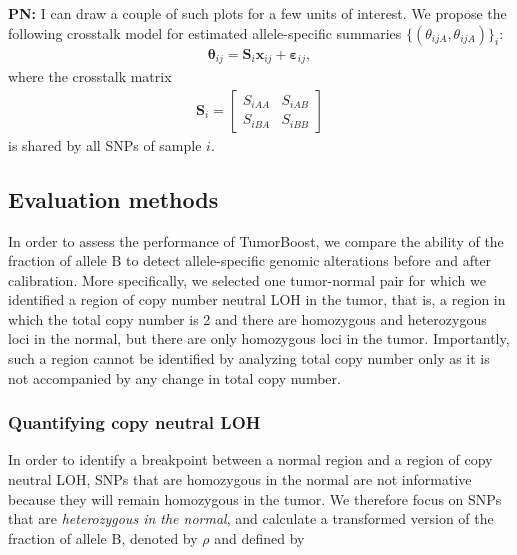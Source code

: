\documentclass[10pt]{bmc_article}
\newenvironment{bmcformat}{\fussy\setboolean{publ}{true}}{\fussy}
\newcommand{\bx}{\mathbf{x}\xspace}
\newcommand{\bS}{\mathbf{S}\xspace}
\newcommand{\beps}{\bm{\varepsilon}\xspace}
\newcommand{\btheta}{\bm{\theta}\xspace}
\newenvironment{PN}{\color{blue}\textbf{PN:}}{}
\begin{document}
\begin{bmcformat}
\begin{PN}
   I can draw a couple of such plots for a few units of interest.
\end{PN}
We propose the following crosstalk model for estimated allele-specific summaries $\{(\theta_{ijA},\theta_{ijA})\}_i$:
\begin{eqnarray*}
  \btheta_{ij} = \bS_i \bx_{ij} + \beps_{ij},
\end{eqnarray*}
where the crosstalk matrix
\begin{eqnarray*}
 \bS_i = 
 \begin{bmatrix}
   S_{iAA} & S_{iAB} \\
   S_{iBA} & S_{iBB}
 \end{bmatrix}
\end{eqnarray*}
is shared by all SNPs of sample $i$.

\subsection*{Evaluation methods}
\label{secEvaluation}

In order to assess the performance of TumorBoost, we compare the ability of the fraction of allele B to detect allele-specific genomic alterations before and after calibration. More specifically, we selected one tumor-normal pair for which we identified a region of copy number neutral LOH in the tumor, that is, a region in which the total copy number is 2 and there are homozygous and heterozygous loci in the normal, but there are only homozygous loci in the tumor. Importantly, such a region cannot be identified by analyzing total copy number only as it is not accompanied by any change in total copy number.

 
\subsubsection*{Quantifying copy neutral LOH}
In order to identify a breakpoint between a normal region and a region of copy neutral LOH, SNPs that are homozygous in the normal are not informative because they will remain homozygous in the tumor. We therefore focus on SNPs that are \emph{heterozygous in the normal}, and calculate a transformed version of the fraction of allele B, denoted by $\rho$ and defined by


\end{bmcformat}
\end{document}
